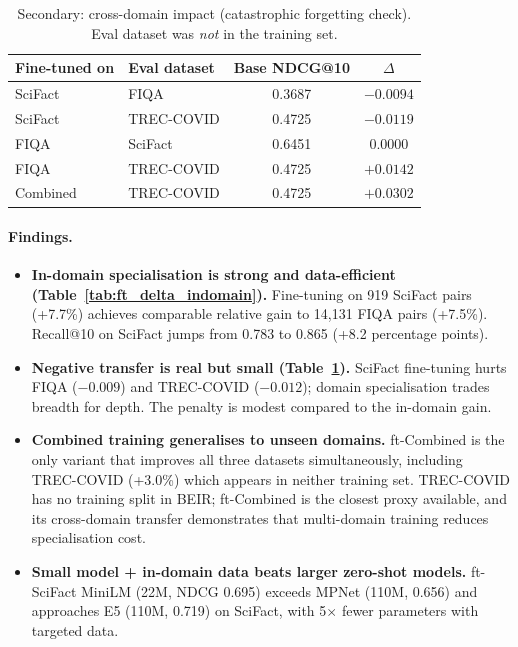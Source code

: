 \documentclass[12pt, a4paper]{article}
\makeatletter
\newcommand{\ndcg}{NDCG@10}
\newcommand{\tc}{TREC-COVID}
\newcommand{\fiqa}{FIQA}
\newcommand{\scifact}{SciFact}
\makeatother
\begin{document}
\begin{table}[h]
\centering
\caption{Secondary: cross-domain impact (catastrophic forgetting check).
  Eval dataset was \emph{not} in the training set.}
\label{tab:ft_delta_crossdomain}
\begin{tabular}{llcc}
\toprule
\textbf{Fine-tuned on} & \textbf{Eval dataset} & \textbf{Base \ndcg{}} & \textbf{$\Delta$} \\
\midrule
\scifact{}     & \fiqa{}  & 0.3687 & $-0.0094$ \\
\scifact{}     & \tc{}    & 0.4725 & $-0.0119$ \\
\fiqa{}        & \scifact{} & 0.6451 & $0.0000$ \\
\fiqa{}        & \tc{}    & 0.4725 & $+0.0142$ \\
Combined       & \tc{}    & 0.4725 & $+0.0302$ \\
\bottomrule
\end{tabular}
\end{table}

\paragraph{Findings.}
\begin{itemize}
  \item \textbf{In-domain specialisation is strong and data-efficient
        (Table~\ref{tab:ft_delta_indomain}).}
        Fine-tuning on 919 SciFact pairs (+7.7\%) achieves comparable
        relative gain to 14,131 FIQA pairs (+7.5\%).  Recall@10 on
        \scifact{} jumps from 0.783 to 0.865 (+8.2 percentage points).

  \item \textbf{Negative transfer is real but small
        (Table~\ref{tab:ft_delta_crossdomain}).}
        \scifact{} fine-tuning hurts \fiqa{} ($-0.009$) and \tc{} ($-0.012$);
        domain specialisation trades breadth for depth.  The penalty is
        modest compared to the in-domain gain.

  \item \textbf{Combined training generalises to unseen domains.}
        ft-Combined is the only variant that improves all three datasets
        simultaneously, including \tc{} (+3.0\%) which appears in neither
        training set.  \tc{} has no training split in BEIR; ft-Combined
        is the closest proxy available, and its cross-domain transfer
        demonstrates that multi-domain training reduces specialisation cost.

  \item \textbf{Small model + in-domain data beats larger zero-shot models.}
        ft-\scifact{} MiniLM (22M, NDCG 0.695) exceeds MPNet (110M, 0.656)
        and approaches E5 (110M, 0.719) on \scifact{}, with 5$\times$ fewer
        parameters with targeted data.
\end{itemize}
\end{document}
